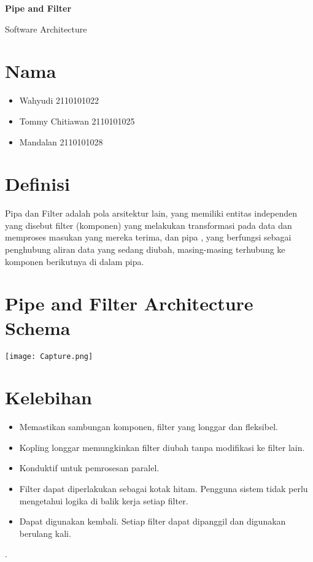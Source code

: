 \documentclass{article}
\begin{document}
	\begin{titlepage}
		\begin{center}
			\textbf{\huge Pipe and Filter}
			
			\vspace{0.5cm}
				
			{\large Software Architecture}
			
			\vspace{2.5cm}
			
			\section*{Nama}
			\begin{varwidth}{\textwidth}
				\begin{itemize}
					\item Wahyudi 2110101022
					\item Tommy Chitiawan 2110101025
					\item Mandalan 2110101028
				\end{itemize}
			\end{varwidth}

			
			
		\end{center}

	\end{titlepage}
	\section{Definisi}
	Pipa dan Filter adalah pola arsitektur lain, yang memiliki entitas independen yang disebut filter (komponen) yang melakukan transformasi pada data dan memproses masukan yang mereka terima, dan pipa , yang berfungsi sebagai penghubung aliran data yang sedang diubah, masing-masing terhubung ke komponen berikutnya di dalam pipa.
	
	\section{Pipe and Filter Architecture Schema
	}
\texttt{[image: Capture.png]}

	\section{Kelebihan}
	
	\begin{itemize}
		\item Memastikan sambungan komponen, filter yang longgar dan fleksibel.
		\item Kopling longgar memungkinkan filter diubah tanpa modifikasi ke filter lain.
		\item Konduktif untuk pemrosesan paralel.
		\item Filter dapat diperlakukan sebagai kotak hitam. Pengguna sistem tidak perlu mengetahui logika di balik kerja setiap filter.
		\item Dapat digunakan kembali. Setiap filter dapat dipanggil dan digunakan berulang kali.
	\end{itemize}
.
	
\end{document}
